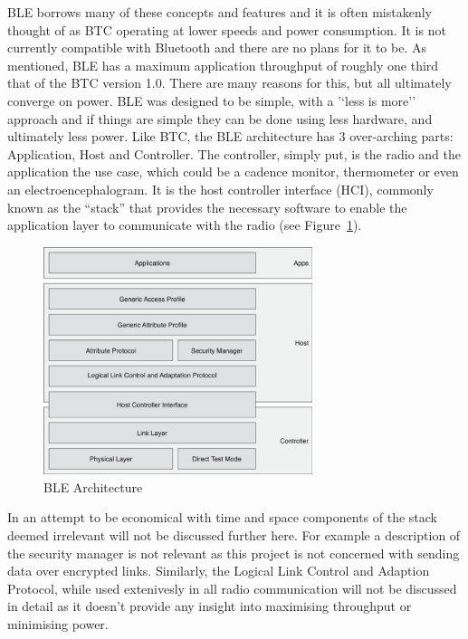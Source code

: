 \documentclass[]{article}
\begin{document}
BLE borrows many of these concepts and features and it is often mistakenly thought of as \ac{BTC} operating at lower speeds and power consumption. It is not currently compatible with Bluetooth and there are no plans for it to be. As mentioned, \ac{BLE} has a maximum application throughput of roughly one third that of the \ac{BTC} version 1.0. There are many reasons for this, but all ultimately converge on power. BLE was designed to be simple, with a '‘less is more’' approach and if things are simple they can be done using less hardware, and ultimately less power. Like \ac{BTC}, the \ac{BLE} architecture has 3 over-arching parts: Application, Host and Controller. The controller, simply put, is the radio and the application the use case, which could be a cadence monitor, thermometer or even an electroencephalogram. It is the host controller interface (HCI), commonly known as the “stack” that provides the necessary software to enable the application layer to communicate with the radio (see Figure~\ref{fig:ble_arch}).

\begin{figure}[htb]
	\begin{center}
		\includegraphics[width = 0.7\textwidth]{ble_arch}
	\end{center}
	\caption{\ac{BLE} Architecture}
	\label{fig:ble_arch}
\end{figure}

In an attempt to be economical with time and space components of the stack deemed irrelevant will not be discussed further here. For example a description of the security manager is not relevant as this project is not concerned with sending data over encrypted links. Similarly, the Logical Link Control and Adaption Protocol, while used extenivesly in all radio communication will not be discussed in detail as it doesn't provide any insight into maximising throughput or minimising power.
\end{document}
